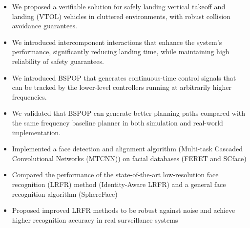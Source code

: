 \cventryspace
{}
\begin{itemize}
  \item We proposed a verifiable solution for safely landing vertical takeoff and landing (VTOL) vehicles in cluttered environments, with robust collision avoidance guarantees.
  \item We introduced intercomponent interactions that enhance the system’s performance, significantly reducing landing time, while maintaining high reliability of safety guarantees.
\end{itemize}
\begin{itemize}
  \item We introduced BSPOP that generates continuous-time control signals that can be tracked by the lower-level controllers running at arbitrarily higher frequencies.
  \item We validated that BSPOP can generate better planning paths compared with the same frequency baseline planner in both simulation and real-world implementation.
\end{itemize}

\cventryspace
{}
\begin{itemize}
  \item Implemented a face detection and alignment algorithm (Multi-task Cascaded Convolutional Networks (MTCNN)) on facial databases (FERET and SCface)
  \item Compared the performance of the state-of-the-art low-resolution face recognition (LRFR) method (Identity-Aware LRFR) and a general face recognition algorithm (SphereFace)
  \item Proposed improved LRFR methods to be robust against noise and achieve higher recognition accuracy in real surveillance systems
\end{itemize}

